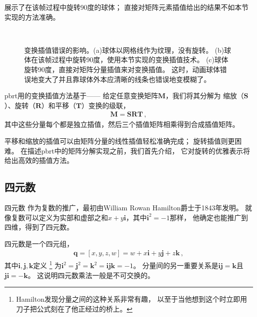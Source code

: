 展示了在该帧过程中旋转90度的球体；
直接对矩阵元素插值给出的结果不如本节实现的方法准确。
\begin{figure}[htb]
    \raggedright
    \\%
    \quad%
    \begin{minipage}{0.45\textwidth}
        \vspace{-\linewidth}\caption{变换插值错误的影响。(a)球体以网格线作为纹理，没有旋转。
            (b)球体在该帧过程中旋转90度，使用本节实现的变换插值技术。
            (c)球体旋转90度，直接对矩阵分量插值来对变换插值。
            这时，动画球体错误地变大了并且靠球体外本应清晰的线条也错误地变模糊了。}
        \label{fig:2.16}
    \end{minipage}
\end{figure}

pbrt用的变换插值方法基于——
给定任意变换矩阵$\bm M$，我们将其分解为
缩放（$\bm S$）、旋转（$\bm R$）和平移（$\bm T$）变换的级联，
\begin{align*}
    \bm M=\bm S\bm R\bm T\, ,
\end{align*}
其中这些分量每个都是独立插值，然后三个插值矩阵相乘得到合成插值矩阵。

平移和缩放的插值可以由矩阵分量的线性插值轻松准确完成；
旋转插值则更困难。
在描述pbrt中的矩阵分解实现之前，我们首先介绍，
它对旋转的优雅表示将给出高效的插值方法。

\subsection{四元数}\label{sub:四元数}
四元数
作为复数的推广，最初由William Rowan Hamilton爵士于1843年发明。
就像复数可以定义为实部和虚部之和$x+y\mathbf{i}$，其中$\mathbf{i}^2=-1$那样，
他确定也能推广到四维，得到了四元数。

四元数是一个四元组，
\begin{align}\label{eq:2.4}
    \bm q=[x,y,z,w]=w+x\mathbf{i}+y\mathbf{j}+z\mathbf{k}\, ,
\end{align}
其中$\mathbf{i}, \mathbf{j}, \mathbf{k}$定义
\footnote{Hamilton发现分量之间的这种关系非常有趣，
    以至于当他想到这个时立即用刀子把公式刻在了他正经过的桥上。}
为$\mathbf{i}^2=\mathbf{j}^2=\mathbf{k}^2=\mathbf{i}\mathbf{j}\mathbf{k}=-1$。
分量间的另一重要关系是$\mathbf{i}\mathbf{j}=\mathbf{k}$且
$\mathbf{j}\mathbf{i}=-\mathbf{k}$。
这说明四元数乘法一般是不可交换的。

